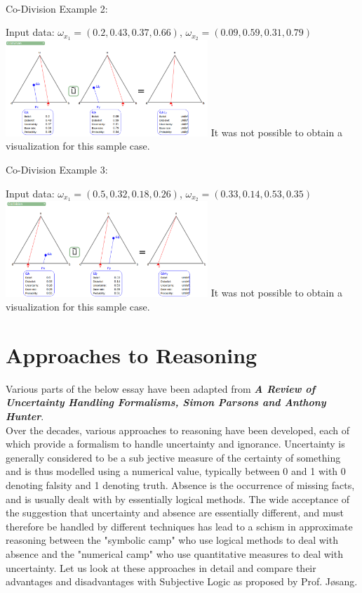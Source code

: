 \documentclass[UTF8]{article}
\newcommand{\mycite}[1]{\textbf{\textit{#1}}}
\newcommand{\opinion}[5]{$\omega_{#1} = (#2, #3, #4, #5)$}
\begin{document}
\hrulefill\\
Co-Division Example 2:
    \begin{center}
        Input data: 
        \opinion{x_1}{0.2}{0.43}{0.37}{0.66}, 
        \opinion{x_2}{0.09}{0.59}{0.31}{0.79}\\
        \includegraphics[width=3in]{images/codiv2.png}
        It was not possible to obtain a visualization for this sample case.
    \end{center}
Co-Division Example 3:
    \begin{center}
        Input data: 
        \opinion{x_1}{0.5}{0.32}{0.18}{0.26}, 
        \opinion{x_2}{0.33}{0.14}{0.53}{0.35}\\
        \includegraphics[width=3in]{images/codiv3.png}
        It was not possible to obtain a visualization for this sample case.
\end{center}
\section{Approaches to Reasoning}
Various parts of the below essay have been adapted from \mycite{A Review of Uncertainty Handling Formalisms, Simon Parsons and Anthony Hunter}.\\
Over the decades, various approaches to reasoning have been developed, each of which provide a formalism to handle uncertainty and ignorance. Uncertainty is generally considered to be a sub jective measure of the certainty of something and is
thus modelled using a numerical value, typically between 0 and 1 with 0 denoting falsity and 1 denoting truth. Absence is the occurrence of missing facts,
and is usually dealt with by essentially logical methods. The wide acceptance of
the suggestion that uncertainty and absence are essentially different, and must
therefore be handled by different techniques has lead to a schism in approximate
reasoning between the "symbolic camp" who use logical methods to deal with
absence and the "numerical camp" who use quantitative measures to deal with
uncertainty. Let us look at these approaches in detail and compare their advantages and disadvantages with Subjective Logic as proposed by Prof. Jøsang.
\end{document}
